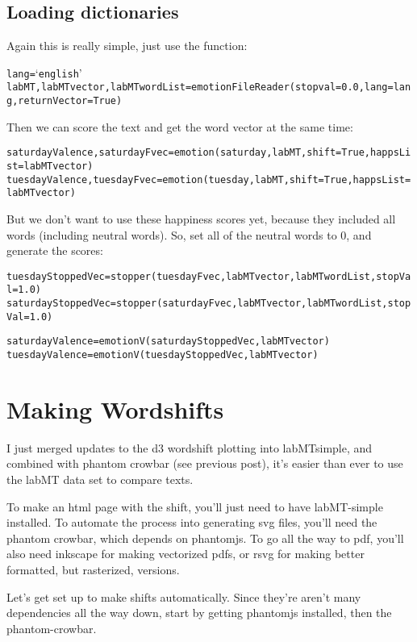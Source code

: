 \documentclass[letterpaper,10pt,english]{sphinxmanual}
\begin{document}
\section{Loading dictionaries}
\label{detailed-example:loading-dictionaries}
Again this is really simple, just use the  function:
\begin{alltt}
lang = `english'
labMT,labMTvector,labMTwordList = emotionFileReader(stopval=0.0,lang=lang,returnVector=True)
\end{alltt}

Then we can score the text and get the word vector at the same time:
\begin{alltt}
saturdayValence,saturdayFvec = emotion(saturday,labMT,shift=True,happsList=labMTvector)
tuesdayValence,tuesdayFvec = emotion(tuesday,labMT,shift=True,happsList=labMTvector)
\end{alltt}

But we don't want to use these happiness scores yet, because they included all words (including neutral words).
So, set all of the neutral words to 0, and generate the scores:
\begin{alltt}
tuesdayStoppedVec = stopper(tuesdayFvec,labMTvector,labMTwordList,stopVal=1.0)
saturdayStoppedVec = stopper(saturdayFvec,labMTvector,labMTwordList,stopVal=1.0)

saturdayValence = emotionV(saturdayStoppedVec,labMTvector)
tuesdayValence = emotionV(tuesdayStoppedVec,labMTvector)
\end{alltt}


\chapter{Making Wordshifts}
\label{wordshifts::doc}\label{wordshifts:making-wordshifts}
I just merged updates to the d3 wordshift plotting into labMTsimple, and combined with phantom crowbar (see previous post), it's easier than ever to use the labMT data set to compare texts.

To make an html page with the shift, you'll just need to have labMT-simple installed.
To automate the process into generating svg files, you'll need the phantom crowbar, which depends on phantomjs.
To go all the way to pdf, you'll also need inkscape for making vectorized pdfs, or rsvg for making better formatted, but rasterized, versions.

Let's get set up to make shifts automatically.
Since they're aren't many dependencies all the way down, start by getting phantomjs installed, then the phantom-crowbar.
\end{document}
